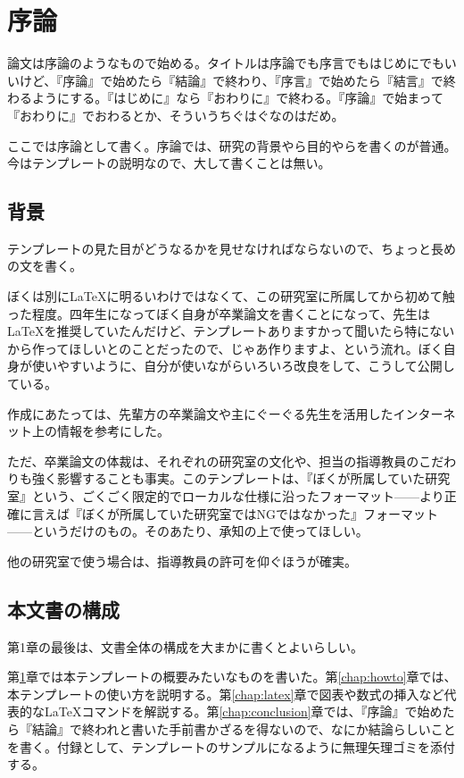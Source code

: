 \chapter{序論}
\label{chap:introduction}

論文は序論のようなもので始める。タイトルは序論でも序言でもはじめにでもいいけど、『序論』で始めたら『結論』で終わり、『序言』で始めたら『結言』で終わるようにする。『はじめに』なら『おわりに』で終わる。『序論』で始まって『おわりに』でおわるとか、そういうちぐはぐなのはだめ。

ここでは序論として書く。序論では、研究の背景やら目的やらを書くのが普通。今はテンプレートの説明なので、大して書くことは無い。


\section{背景}

テンプレートの見た目がどうなるかを見せなければならないので、ちょっと長めの文を書く。

ぼくは別に\LaTeX に明るいわけではなくて、この研究室に所属してから初めて触った程度。四年生になってぼく自身が卒業論文を書くことになって、先生は\LaTeX を推奨していたんだけど、テンプレートありますかって聞いたら特にないから作ってほしいとのことだったので、じゃあ作りますよ、という流れ。ぼく自身が使いやすいように、自分が使いながらいろいろ改良をして、こうして公開している。

作成にあたっては、先輩方の卒業論文や主にぐーぐる先生を活用したインターネット上の情報を参考にした。

ただ、卒業論文の体裁は、それぞれの研究室の文化や、担当の指導教員のこだわりも強く影響することも事実。このテンプレートは、『ぼくが所属していた研究室』という、ごくごく限定的でローカルな仕様に沿ったフォーマット——より正確に言えば『ぼくが所属していた研究室ではNGではなかった』フォーマット——というだけのもの。そのあたり、承知の上で使ってほしい。

他の研究室で使う場合は、指導教員の許可を仰ぐほうが確実。


\section{本文書の構成}

第1章の最後は、文書全体の構成を大まかに書くとよいらしい。

第\ref{chap:introduction}章では本テンプレートの概要みたいなものを書いた。第\ref{chap:howto}章では、本テンプレートの使い方を説明する。第\ref{chap:latex}章で図表や数式の挿入など代表的な\LaTeX コマンドを解説する。第\ref{chap:conclusion}章では、『序論』で始めたら『結論』で終われと書いた手前書かざるを得ないので、なにか結論らしいことを書く。付録として、テンプレートのサンプルになるように無理矢理ゴミを添付する。